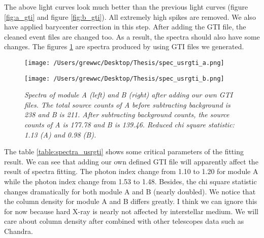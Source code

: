 \documentclass[12pt]{report}
\newcommand{\mycaption}[1]{\caption{\textit{\footnotesize #1}}}
\begin{document}
        \indent The above light curves look much better than the previous light curves 
        (figure \ref{fig:a_gti} 
        and figure \ref{fig:b_gti}). All extremely high spikes are removed. We also have 
        applied barycenter
        correction in this step. After adding the GTI file, the cleaned event files are changed too. As a result, 
        the spectra should also have some changes. The figures \ref{fig:spectra_usrgti}
        are spectra produced by using GTI files we generated.  

        \begin{figure}[!ht] 
          \begin{minipage}{0.45\textwidth}
            \begin{flushleft} 
                \texttt{[image: /Users/grewwc/Desktop/Thesis/spec\_usrgti\_a.png]}
            \end{flushleft}
            \end{minipage}
          \begin{minipage}{0.45\textwidth}
            \begin{flushleft}
            \texttt{[image: /Users/grewwc/Desktop/Thesis/spec\_usrgti\_b.png]}
            \end{flushleft}
          \end{minipage}
          \centering
          \begin{minipage}{0.8\textwidth}
          \mycaption{Spectra of module A (left) and B (right) after adding our own GTI files. 
                    The total source counts of A before subtracting background is 238 and B is 211. 
                    After subtracting background counts, 
                    the source counts of A is 177.78 and B is 139.46. Reduced chi square statistic: 1.13 (A) and 
                    0.98 (B).}
          \label{fig:spectra_usrgti}
          \end{minipage}
          \end{figure}

          \indent The table \ref{table:spectra_usrgti} shows some critical parameters of the fitting result. 
          We can see that adding our own defined GTI file will apparently affect the result of spectra fitting. 
          The photon index change from 1.10 to 1.20 for module A while the photon index change from 1.53 to 
          1.48. Besides, the chi square statistic changes dramatically for both module A and B (nearly doubled).
          We notice that the column density for module A and B differs greatly. 
          I think we can ignore this for now because hard X-ray is nearly not affected by
          interstellar medium. We will care about column density after combined with other telescopes data such 
          as Chandra. 
\end{document}
